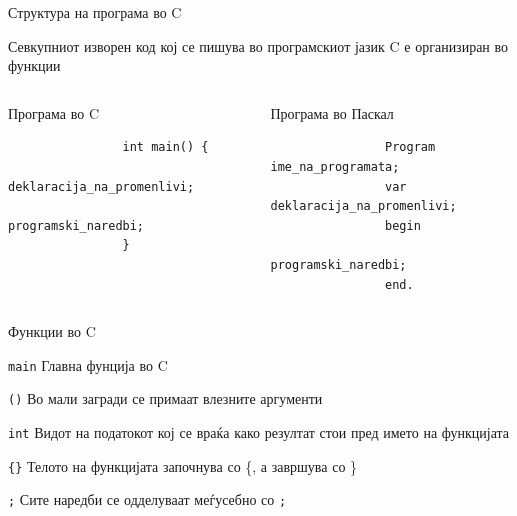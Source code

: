 \begin{frame}[fragile]{Структура на програма во C}

	Севкупниот изворен код кој се пишува во програмскиот јазик C е организиран во функции
	\linebreak
	
	\begin{columns}[t]
			\begin{block}{Програма во C}
				\begin{lstlisting}
				int main() {
				    deklaracija_na_promenlivi;
				    programski_naredbi;
				}
				\end{lstlisting}
			\end{block}
			\begin{block}{Програма во Паскал}
				\begin{lstlisting}
				Program ime_na_programata;
				var deklaracija_na_promenlivi;
				begin
				    programski_naredbi;
				end.
				\end{lstlisting}
			\end{block}
	\end{columns}

\end{frame}

\begin{frame}[shrink=10]{Функции во C}
 	\hfill
  	\begin{block}{\texttt{main}}
  		Главна фунција во C
  	\end{block}
  	
  	\begin{block}{\texttt{()}}
		Во мали загради се примаат влезните аргументи
  	\end{block}
  	
  	\begin{block}{\texttt{int}}
		Видот на податокот кој се враќа како резултат стои пред името на функцијата
  	\end{block}
  	
  	\begin{block}{\texttt{\{\}}}
		Телото на функцијата започнува со \{, а завршува со \}
  	\end{block}

	\begin{block}{\texttt{;}}
  	Сите наредби се одделуваат меѓусебно со \texttt{;}
  	\end{block}

\end{frame}

